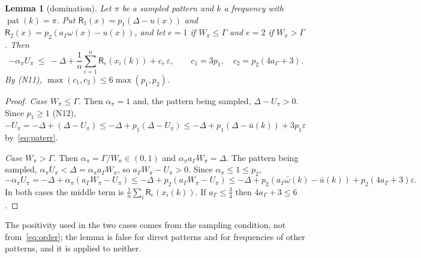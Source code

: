 \documentclass[11pt]{article}
\newtheorem{lemma}{Lemma}[section]
\theoremstyle{definition}
\newcommand{\eps}{\varepsilon}
\newcommand{\pat}{\operatorname{pat}}
\begin{document}
\begin{lemma}[domination]\label{lem:B2}
Let $\pi$ be a sampled pattern and $k$ a frequency with $\pat(k)=\pi$. Put $\mathsf R_1(x)=p_1(\Delta-u(x))$ and
$\mathsf R_2(x)=p_2(a_\Gamma\omega(x)-u(x))$, and let $e=1$ if $W_\pi\le\Gamma$ and $e=2$ if $W_\pi>\Gamma$. Then
\begin{equation}\label{eq:dom}
 -\alpha_\pi U_\pi\ \le\ -\Delta+\frac1n\sum_{i=1}^n\mathsf R_e(x_i(k))+c_e\,\eps,\qquad c_1=3p_1,\quad c_2=p_2(4a_\Gamma+3).
\end{equation}
By \textup{(N11)}, $\max(c_1,c_2)\le6\max(p_1,p_2)$.
\end{lemma}
\begin{proof}
\emph{Case $W_\pi\le\Gamma$.} Then $\alpha_\pi=1$ and, the pattern being sampled, $\Delta-U_\pi>0$. Since $p_1\ge1$
\textup{(N12)}, $-U_\pi=-\Delta+(\Delta-U_\pi)\le-\Delta+p_1(\Delta-U_\pi)\le-\Delta+p_1(\Delta-\bar u(k))+3p_1\eps$
by~\eqref{eq:paterr}.

\emph{Case $W_\pi>\Gamma$.} Then $\alpha_\pi=\Gamma/W_\pi\in(0,1)$ and $\alpha_\pi a_\Gamma W_\pi=\Delta$. The pattern
being sampled, $\alpha_\pi U_\pi<\Delta=\alpha_\pi a_\Gamma W_\pi$, so $a_\Gamma W_\pi-U_\pi>0$. Since
$\alpha_\pi\le1\le p_2$,
\[
 -\alpha_\pi U_\pi=-\Delta+\alpha_\pi(a_\Gamma W_\pi-U_\pi)\le-\Delta+p_2(a_\Gamma W_\pi-U_\pi)
 \le-\Delta+p_2(a_\Gamma\bar\omega(k)-\bar u(k))+p_2(4a_\Gamma+3)\eps .
\]
In both cases the middle term is $\frac1n\sum_i\mathsf R_e(x_i(k))$. If $a_\Gamma\le\tfrac34$ then
$4a_\Gamma+3\le6$.
\end{proof}
The positivity used in the two cases comes from the sampling condition, not from~\eqref{eq:order}; the lemma is
false for direct patterns and for frequencies of other patterns, and it is applied to neither.
\end{document}
